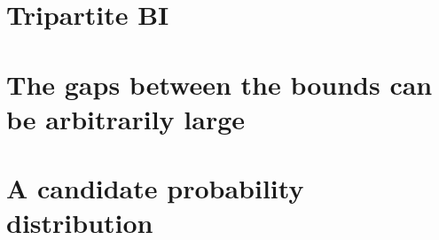 \section{Tripartite BI}
    \lipsum[1]
\section{The gaps between the bounds can be arbitrarily large}
    \lipsum[3]
\section{A candidate probability distribution}
    \lipsum[6]